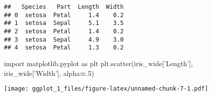 \documentclass[]{article}
\newenvironment{Shaded}{\begin{snugshade}}{\end{snugshade}}
\newcommand{\CharTok}[1]{\textcolor[rgb]{0.31,0.60,0.02}{#1}}
\newcommand{\DataTypeTok}[1]{\textcolor[rgb]{0.13,0.29,0.53}{#1}}
\newcommand{\DecValTok}[1]{\textcolor[rgb]{0.00,0.00,0.81}{#1}}
\newcommand{\ImportTok}[1]{#1}
\newcommand{\KeywordTok}[1]{\textcolor[rgb]{0.13,0.29,0.53}{\textbf{#1}}}
\newcommand{\NormalTok}[1]{#1}
\newcommand{\OperatorTok}[1]{\textcolor[rgb]{0.81,0.36,0.00}{\textbf{#1}}}
\newcommand{\StringTok}[1]{\textcolor[rgb]{0.31,0.60,0.02}{#1}}
\begin{document}
\begin{verbatim}
##   Species   Part  Length  Width
## 0  setosa  Petal     1.4    0.2
## 1  setosa  Sepal     5.1    3.5
## 2  setosa  Petal     1.4    0.2
## 3  setosa  Sepal     4.9    3.0
## 4  setosa  Petal     1.3    0.2
\end{verbatim}

\begin{Shaded}
\begin{Highlighting}[]
\ImportTok{import}\NormalTok{ matplotlib.pyplot }\ImportTok{as}\NormalTok{ plt}
\NormalTok{plt.scatter(iris_wide[}\StringTok{'Length'}\NormalTok{], iris_wide[}\StringTok{'Width'}\NormalTok{], alpha}\OperatorTok{=}\NormalTok{.}\DecValTok{5}\NormalTok{)}
\end{Highlighting}
\end{Shaded}

\texttt{[image: ggplot\_1\_files/figure-latex/unnamed-chunk-7-1.pdf]}

\begin{Shaded}
\end{Shaded}
\end{document}
